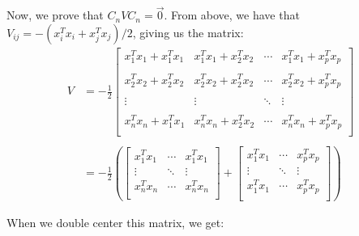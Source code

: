 \documentclass[a4paper]{article}
\begin{document}
Now, we prove that $C_nVC_n = \vec{0}$.  From above, we have that 
$V_{ij} = -(x_i^Tx_i + x_j^Tx_j)/2$, giving us the matrix:
\begin{align*}
  V &= -\frac{1}{2}
  \begin{bmatrix}
    x_1^Tx_1 + x_1^Tx_1 & x_1^Tx_1 + x_2^Tx_2 & \cdots & x_1^Tx_1 + x_p^Tx_p\\\\
    x_2^Tx_2 + x_2^Tx_2 & x_2^Tx_2 + x_2^Tx_2 & \cdots & x_2^Tx_2 + x_p^Tx_p\\\\
    \vdots & \vdots & \ddots & \vdots \\\\
    x_n^Tx_n + x_1^Tx_1 & x_n^Tx_n + x_2^Tx_2 & \cdots & x_n^Tx_n + x_p^Tx_p\\
  \end{bmatrix}\\\\
  &= -\frac{1}{2} \left(
    \begin{bmatrix}
      x_1^Tx_1 & \cdots & x_1^Tx_1 \\
      \vdots & \ddots & \vdots \\
      x_n^Tx_n & \cdots & x_n^Tx_n\\
    \end{bmatrix}
    + 
    \begin{bmatrix}
      x_1^Tx_1 & \cdots & x_p^Tx_p \\
      \vdots & \ddots & \vdots \\
      x_1^Tx_1 & \cdots & x_p^Tx_p\\
    \end{bmatrix}
  \right)
\end{align*}

When we double center this matrix, we get:
\end{document}
